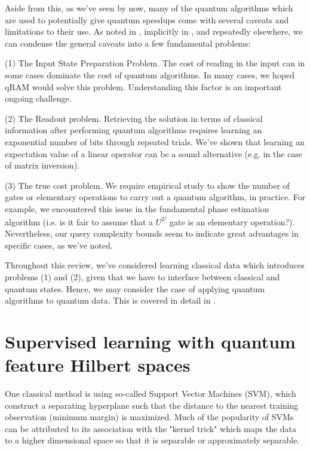 \documentclass[main.tex]{subfiles}
\begin{document}
Aside from this, as we've seen by now, many of the quantum algorithms which are used to potentially give quantum speedups come with several caveats and limitations to their use. As noted in \cite{biamonte2017quantum}, implicitly in \cite{aaronson2015read}, and repeatedly elsewhere, we can condense the general caveats into a few fundamental problems: 

(1) The Input State Preparation Problem. The cost of reading in the input can in some cases dominate the cost of quantum algorithms. In many cases, we hoped qRAM would solve this problem. Understanding this factor is an important ongoing challenge.

(2) The Readout problem. Retrieving the solution in terms of classical information after performing quantum algorithms requires learning an exponential number of bits through repeated trials. We've shown that learning an expectation value of a linear operator can be a sound alternative (e.g. in the case of matrix inversion).

(3) The true cost problem. We require empirical study to show the number of gates or elementary operations to carry out a quantum algorithm, in practice. For example, we encountered this issue in the fundamental phase estimation algorithm (i.e. is it fair to assume that a $U^{2^j}$ gate is an elementary operation?). Nevertheless, our query complexity bounds seem to indicate great advantages in specific cases, as we've noted.

Throughout this review, we've considered learning classical data which introduces problems (1) and (2), given that we have to interface between classical and quantum states. Hence, we may consider the case of applying quantum algorithms to quantum data. This is covered in detail in \cite{aaronson2007learnability}.

\section{Supervised learning with quantum feature Hilbert spaces}
\cite{havlicek2018supervised}


One classical method is using so-called Support Vector Machines (SVM), which construct a separating hyperplane such that the distance to the nearest training observation (minimum margin) is maximized. Much of the popularity of SVMs can be attributed to its association with the "kernel trick" which maps the data to a higher dimensional space so that it is separable or approximately separable.
\end{document}
